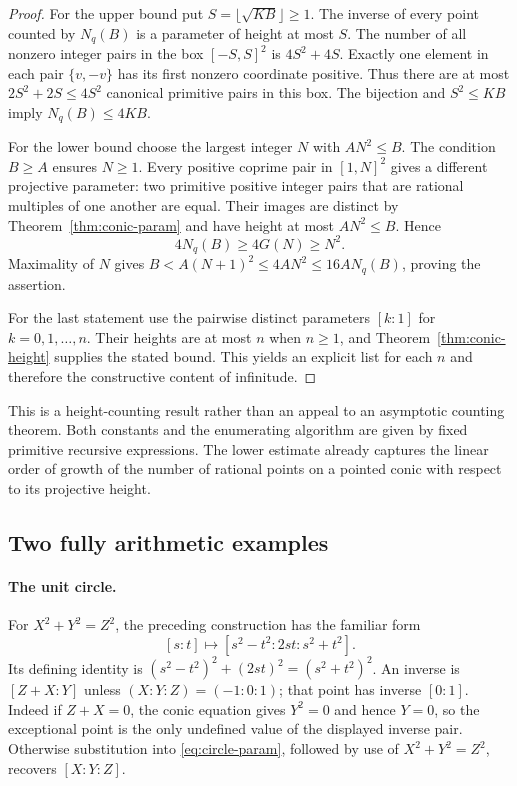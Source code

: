 \begin{proof}
For the upper bound put $S=\lfloor\sqrt{KB}\rfloor\geq1$.
The inverse of every point counted by $N_q(B)$ is a parameter of
height at most $S$.  The number of all nonzero integer pairs in the
box $[-S,S]^2$ is $4S^2+4S$.  Exactly one element in each pair
$\{v,-v\}$ has its first nonzero coordinate positive.  Thus there
are at most $2S^2+2S\leq4S^2$ canonical primitive pairs in this box.
The bijection and $S^2\leq KB$ imply $N_q(B)\leq4KB$.

For the lower bound choose the largest integer $N$ with $AN^2\leq B$.
The condition $B\geq A$ ensures $N\geq1$.
Every positive coprime pair in $[1,N]^2$ gives a different
projective parameter: two primitive positive integer pairs that
are rational multiples of one another are equal.  Their images
are distinct by Theorem~\ref{thm:conic-param} and have height at
most $AN^2\leq B$.  Hence
\[
 4N_q(B)\geq4G(N)\geq N^2.
\]
Maximality of $N$ gives
$B<A(N+1)^2\leq4AN^2\leq16AN_q(B)$, proving the assertion.

For the last statement use the pairwise distinct parameters
$[k:1]$ for $k=0,1,\ldots,n$.  Their heights are at most $n$ when
$n\geq1$, and Theorem~\ref{thm:conic-height} supplies the stated
bound.  This yields an explicit list for each $n$ and therefore
the constructive content of infinitude.
\end{proof}

This is a height-counting result rather than an appeal to an
asymptotic counting theorem.  Both constants and the enumerating
algorithm are given by fixed primitive recursive expressions.
The lower estimate already captures the linear order of growth
of the number of rational points on a pointed conic with respect
to its projective height.

\subsection{Two fully arithmetic examples}

\paragraph{The unit circle.}
For $X^2+Y^2=Z^2$, the preceding construction has the familiar form
\begin{equation}\label{eq:circle-param}
 [s:t]\longmapsto[s^2-t^2:2st:s^2+t^2].
\end{equation}
Its defining identity is
$(s^2-t^2)^2+(2st)^2=(s^2+t^2)^2$.
An inverse is $[Z+X:Y]$ unless $(X:Y:Z)=(-1:0:1)$; that point has
inverse $[0:1]$.  Indeed if $Z+X=0$, the conic equation gives
$Y^2=0$ and hence $Y=0$, so the exceptional point is the only
undefined value of the displayed inverse pair.  Otherwise
substitution into \eqref{eq:circle-param}, followed by use of
$X^2+Y^2=Z^2$, recovers $[X:Y:Z]$.

